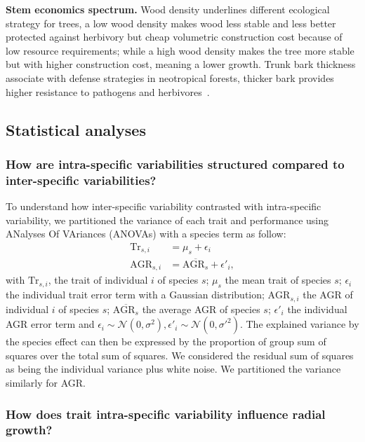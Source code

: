 \textbf{Stem economics spectrum.} Wood density underlines different ecological strategy for trees, a low wood density makes wood less stable and less better protected against herbivory but cheap volumetric construction cost because of low resource requirements; while a high wood density makes the tree more stable but with higher construction cost, meaning a lower growth. Trunk bark thickness associate with defense strategies in neotropical forests, thicker bark provides higher resistance to pathogens and herbivores~\citep{paine_functional_2010}.

\subsection*{Statistical analyses}

\subsubsection*{How are intra-specific variabilities structured compared to inter-specific variabilities?}

To understand how inter-specific variability contrasted with intra-specific variability, we partitioned the variance of each trait and performance using ANalyses Of VAriances (ANOVAs) with a species term as follow:
\begin{subequations}
	\begin{align}
	\label{eq:anovatrait}
	\text{Tr}_{s, i} &= \mu_s + \epsilon_i\\
	\label{eq:anovaagr}
	\text{AGR}_{s, i} &= \overline{\text{AGR}_{s}} + \epsilon'_i,
	\end{align}
\end{subequations}
with $\text{Tr}_{s, i}$, the trait of individual $i$ of species $s$; $\mu_s$ the mean trait of species $s$; $\epsilon_i$ the individual trait error term with a Gaussian distribution; $\text{AGR}_{s, i}$ the AGR of individual $i$ of species $s$; $\overline{\text{AGR}_{s}}$ the average AGR of species $s$; $\epsilon'_i$ the individual AGR error term and $\epsilon_i \sim \mathcal{N}(0, \sigma^2), \epsilon'_i \sim \mathcal{N}(0, \sigma'^2)$. The explained variance by the species effect can then be expressed by the proportion of group sum of squares over the total sum of squares. We considered the residual sum of squares as being the individual variance plus white noise. We partitioned the variance similarly for AGR.

\subsubsection*{How does trait intra-specific variability influence radial growth?}

